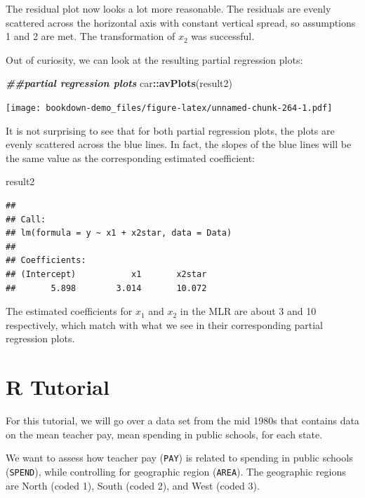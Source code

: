 \documentclass[
]{book}
\newenvironment{Shaded}{\begin{snugshade}}{\end{snugshade}}
\newcommand{\DocumentationTok}[1]{\textcolor[rgb]{0.56,0.35,0.01}{\textbf{\textit{#1}}}}
\newcommand{\FunctionTok}[1]{\textcolor[rgb]{0.13,0.29,0.53}{\textbf{#1}}}
\newcommand{\NormalTok}[1]{#1}
\newcommand{\SpecialCharTok}[1]{\textcolor[rgb]{0.81,0.36,0.00}{\textbf{#1}}}
\begin{document}
The residual plot now looks a lot more reasonable. The residuals are evenly scattered across the horizontal axis with constant vertical spread, so assumptions 1 and 2 are met. The transformation of \(x_2\) was successful.

Out of curiosity, we can look at the resulting partial regression plots:

\begin{Shaded}
\begin{Highlighting}[]
\DocumentationTok{\#\#partial regression plots}
\NormalTok{car}\SpecialCharTok{::}\FunctionTok{avPlots}\NormalTok{(result2)}
\end{Highlighting}
\end{Shaded}

\texttt{[image: bookdown-demo\_files/figure-latex/unnamed-chunk-264-1.pdf]}

It is not surprising to see that for both partial regression plots, the plots are evenly scattered across the blue lines. In fact, the slopes of the blue lines will be the same value as the corresponding estimated coefficient:

\begin{Shaded}
\begin{Highlighting}[]
\NormalTok{result2}
\end{Highlighting}
\end{Shaded}

\begin{verbatim}
## 
## Call:
## lm(formula = y ~ x1 + x2star, data = Data)
## 
## Coefficients:
## (Intercept)           x1       x2star  
##       5.898        3.014       10.072
\end{verbatim}

The estimated coefficients for \(x_1\) and \(x_2\) in the MLR are about 3 and 10 respectively, which match with what we see in their corresponding partial regression plots.

\hypertarget{r-tutorial-7}{%
\section{R Tutorial}\label{r-tutorial-7}}

For this tutorial, we will go over a data set from the mid 1980s that contains data on the mean teacher pay, mean spending in public schools, for each state.

We want to assess how teacher pay (\texttt{PAY}) is related to spending in public schools (\texttt{SPEND}), while controlling for geographic region (\texttt{AREA}). The geographic regions are North (coded 1), South (coded 2), and West (coded 3).
\end{document}
